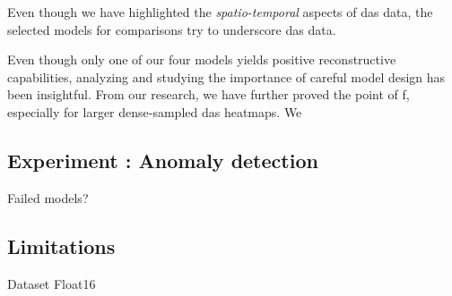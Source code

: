 Even though we have highlighted the \textit{spatio-temporal} aspects of \acrshort{das} data, the selected models for comparisons try to underscore  \acrshort{das} data. 

Even though only one of our four models yields positive reconstructive capabilities, analyzing and studying the importance of careful model design has been insightful. From our research, we have further proved the point of f, especially for larger dense-sampled \acrshort{das} heatmaps. We

\subsection{Experiment : Anomaly detection}

Failed models? 
\subsection{Limitations} 

Dataset
Float16